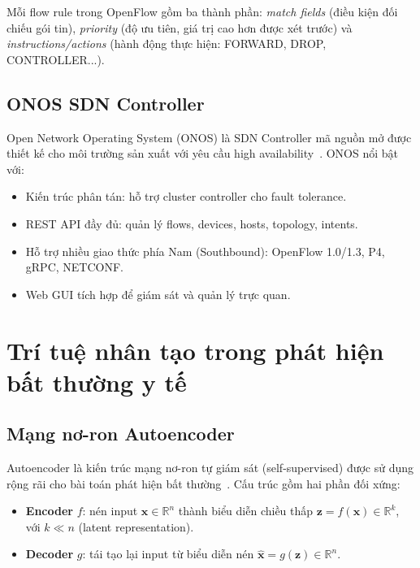 Mỗi flow rule trong OpenFlow gồm ba thành phần: \textit{match fields} (điều kiện đối chiếu gói tin), \textit{priority} (độ ưu tiên, giá trị cao hơn được xét trước) và \textit{instructions/actions} (hành động thực hiện: FORWARD, DROP, CONTROLLER...).

\subsection{ONOS SDN Controller}

Open Network Operating System (ONOS) là SDN Controller mã nguồn mở được thiết kế cho môi trường sản xuất với yêu cầu high availability~\cite{berde2014onos}. ONOS nổi bật với:

\begin{itemize}
    \item Kiến trúc phân tán: hỗ trợ cluster controller cho fault tolerance.
    \item REST API đầy đủ: quản lý flows, devices, hosts, topology, intents.
    \item Hỗ trợ nhiều giao thức phía Nam (Southbound): OpenFlow 1.0/1.3, P4, gRPC, NETCONF.
    \item Web GUI tích hợp để giám sát và quản lý trực quan.
\end{itemize}

\section{Trí tuệ nhân tạo trong phát hiện bất thường y tế}

\subsection{Mạng nơ-ron Autoencoder}

Autoencoder là kiến trúc mạng nơ-ron tự giám sát (self-supervised) được sử dụng rộng rãi cho bài toán phát hiện bất thường~\cite{chandola2009anomaly}. Cấu trúc gồm hai phần đối xứng:

\begin{itemize}
    \item \textbf{Encoder} $f$: nén input $\mathbf{x} \in \mathbb{R}^n$ thành biểu diễn chiều thấp $\mathbf{z} = f(\mathbf{x}) \in \mathbb{R}^k$, với $k \ll n$ (latent representation).
    \item \textbf{Decoder} $g$: tái tạo lại input từ biểu diễn nén $\hat{\mathbf{x}} = g(\mathbf{z}) \in \mathbb{R}^n$.
\end{itemize}

